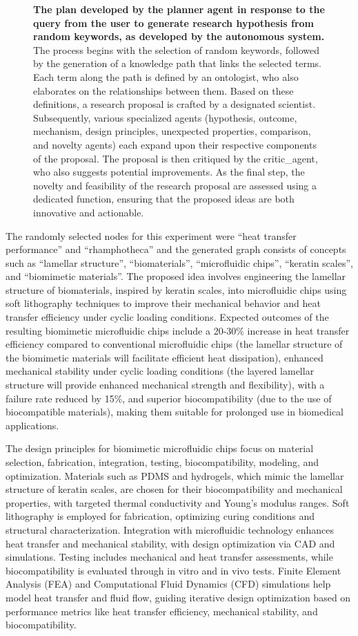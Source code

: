 \documentclass{article}
\begin{document}
\begin{figure}[h]
    \caption{\textbf{The plan developed by the planner agent in response to the query from the user to generate research hypothesis from random keywords, as developed by the autonomous system.} The process begins with the selection of random keywords, followed by the generation of a knowledge path that links the selected terms. Each term along the path is defined by an ontologist, who also elaborates on the relationships between them. Based on these definitions, a research proposal is crafted by a designated scientist. Subsequently, various specialized agents (hypothesis, outcome, mechanism, design principles, unexpected properties, comparison, and novelty agents) each expand upon their respective components of the proposal. The proposal is then critiqued by the critic\_agent, who also suggests potential improvements. As the final step, the novelty and feasibility of the research proposal are assessed using a dedicated function, ensuring that the proposed ideas are both innovative and actionable.}
    \label{fig:heat_planner}
\end{figure}

The randomly selected nodes for this experiment were ``heat transfer performance'' and ``rhamphotheca'' and the generated graph consists of concepts such as ``lamellar structure'', ``biomaterials'', ``microfluidic chips'', ``keratin scales'', and ``biomimetic materials''.
The proposed idea involves engineering the lamellar structure of biomaterials, inspired by keratin scales, into microfluidic chips using soft lithography techniques to improve their mechanical behavior and heat transfer efficiency under cyclic loading conditions. Expected outcomes of the resulting biomimetic microfluidic chips include a 20-30\% increase in heat transfer efficiency compared to conventional microfluidic chips (the lamellar structure of the biomimetic materials will facilitate efficient heat dissipation), enhanced
mechanical stability under cyclic loading conditions (the layered lamellar structure will provide enhanced mechanical strength and flexibility), with a failure rate reduced by 15\%, and superior biocompatibility (due to the use of biocompatible materials), making them suitable for prolonged use in biomedical applications. 

The design principles for biomimetic microfluidic chips focus on material selection, fabrication, integration, testing, biocompatibility, modeling, and optimization. Materials such as PDMS and hydrogels, which mimic the lamellar structure of keratin scales, are chosen for their biocompatibility and mechanical properties, with targeted thermal conductivity and Young's modulus ranges. Soft lithography is employed for fabrication, optimizing curing conditions and structural characterization. Integration with microfluidic technology enhances heat transfer and mechanical stability, with design optimization via CAD and simulations. Testing includes mechanical and heat transfer assessments, while biocompatibility is evaluated through in vitro and in vivo tests. Finite Element Analysis (FEA) and Computational Fluid Dynamics (CFD) simulations help model heat transfer and fluid flow, guiding iterative design optimization based on performance metrics like heat transfer efficiency, mechanical stability, and biocompatibility.
\end{document}
